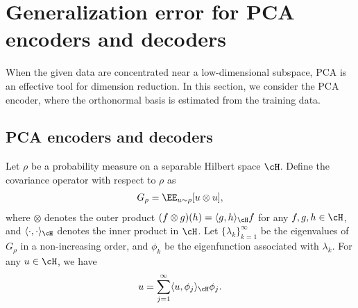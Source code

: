 \documentclass[11pt]{article} %
\begin{document}
\section{Generalization error for PCA encoders and decoders}\label{sec.PCA}

When the given data are concentrated near a low-dimensional subspace, PCA is an effective tool for dimension reduction. In this section, we consider the PCA encoder, where the orthonormal basis is estimated from the training data.
\subsection{PCA encoders and decoders}\label{sec.PCA.intro}
Let $\rho$ be a probability measure on a separable Hilbert space $\cH$. Define the covariance operator with respect to $\rho$ as
\begin{align}
	G_{\rho}=\EE_{u \sim\rho} [u\otimes u],
	\label{eq.C}
\end{align}
where $\otimes$ denotes the outer product $
	(f\otimes g)(h)=\langle g,h\rangle_{\cH} f
$
for any $f,g,h\in\cH$, and $\langle \cdot,\cdot\rangle_{\cH}$ denotes the inner product in $\cH$. %
Let $\{\lambda_k\}_{k=1}^{\infty}$ be the eigenvalues of $G_{\rho}$ in a non-increasing order, and $\phi_k$ be the eigenfunction associated with $\lambda_k$.
For any $u\in \cH$, we have
$$
u=\sum_{j=1}^{\infty} \langle u,\phi_{j}\rangle_{\cH}\phi_{j}.
$$
\end{document}
